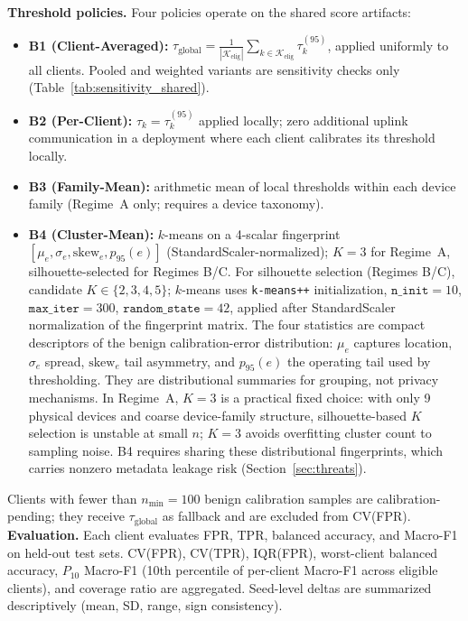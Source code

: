 \textbf{Threshold policies.}
Four policies operate on the shared score artifacts:
\begin{itemize}
  \item \textbf{B1 (Client-Averaged):}
        $\tau_{\text{global}} = \frac{1}{|\mathcal{K}_{\mathrm{elig}}|}\sum_{k\in\mathcal{K}_{\mathrm{elig}}} \tau_k^{(95)}$,
        applied uniformly to all clients.
        Pooled and weighted variants are sensitivity checks only
        (Table~\ref{tab:sensitivity_shared}).

  \item \textbf{B2 (Per-Client):} $\tau_k = \tau_k^{(95)}$ applied locally;
        zero additional uplink communication in a deployment where each client
        calibrates its threshold locally.

  \item \textbf{B3 (Family-Mean):} arithmetic mean of local thresholds within each device
        family (Regime~A only; requires a device taxonomy).

  \item \textbf{B4 (Cluster-Mean):} $k$-means on a 4-scalar fingerprint
        $[\mu_e, \sigma_e, \text{skew}_e, p_{95}(e)]$ (StandardScaler-normalized);
        $K{=}3$ for Regime~A, silhouette-selected for Regimes B/C.
        For silhouette selection (Regimes B/C), candidate $K \in \{2,3,4,5\}$;
        $k$-means uses \texttt{k-means++} initialization, $\texttt{n\_init}{=}10$,
        $\texttt{max\_iter}{=}300$, $\texttt{random\_state}{=}42$, applied after
        StandardScaler normalization of the fingerprint matrix.
        The four statistics are compact descriptors of the benign calibration-error
        distribution: $\mu_e$ captures location, $\sigma_e$ spread, $\text{skew}_e$
        tail asymmetry, and $p_{95}(e)$ the operating tail used by thresholding.
        They are distributional summaries for grouping, not privacy mechanisms.
        In Regime~A, $K{=}3$ is a practical fixed choice: with only 9 physical devices
        and coarse device-family structure, silhouette-based $K$ selection is unstable
        at small $n$; $K{=}3$ avoids overfitting cluster count to sampling noise.
        B4 requires sharing these distributional fingerprints, which carries nonzero
        metadata leakage risk (Section~\ref{sec:threats}).
\end{itemize}

Clients with fewer than $n_{\min}{=}100$ benign calibration samples are calibration-pending;
they receive $\tau_{\text{global}}$ as fallback and are excluded from CV(FPR).
\textbf{Evaluation.}
Each client evaluates FPR, TPR, balanced accuracy, and Macro-F1 on held-out test sets.
CV(FPR), CV(TPR), IQR(FPR), worst-client balanced accuracy, $P_{10}$ Macro-F1 (10th percentile
of per-client Macro-F1 across eligible clients), and coverage ratio are aggregated.
Seed-level deltas are summarized descriptively (mean, SD, range, sign consistency).
